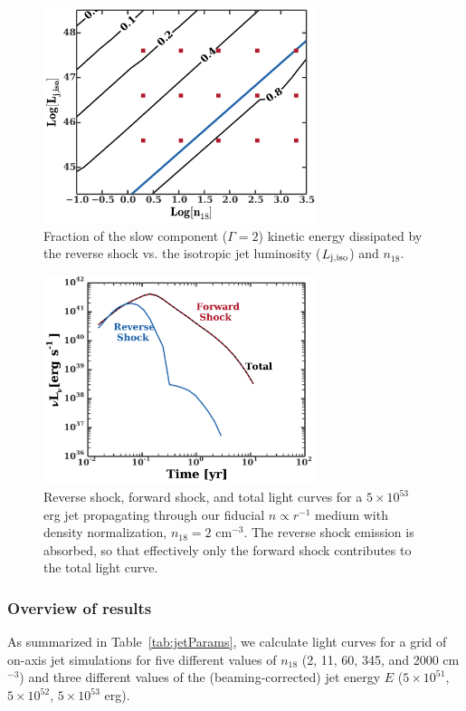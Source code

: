 \documentclass[usenatbib,fleqn]{mnras}
\begin{document}
\begin{figure}
\includegraphics[width=8cm]{diss.pdf}
\caption{\label{fig:diss} Fraction of the slow component
  ($\Gamma=2$) kinetic energy dissipated by the reverse shock
  vs. the isotropic jet luminosity ($L_{\rm j,iso}$) and $n_{18}$.}
\end{figure}

\begin{figure}
  \includegraphics[width=8cm]{reverse.pdf}
  \caption{\label{fig:reverse} Reverse shock, forward shock, and total
    light curves for a $5\times 10^{53}$ erg jet propagating through
    our fiducial $n\propto r^{-1}$ medium with density normalization,
    $n_{18}=2$ cm$^{-3}$. The reverse shock emission is absorbed, so
    that effectively only the forward shock contributes to the total
    light curve.}
\end{figure}


\subsubsection{Overview of results}
As summarized in Table~\ref{tab:jetParams}, we calculate light curves
for a grid of on-axis jet simulations for five different values of
$n_{18}$ (2, 11, 60, 345, and 2000 cm$^{-3}$) and three different
values of the (beaming-corrected) jet energy $E$ ($5\times 10^{51}$,
$5\times 10^{52}$, $5\times 10^{53}$ erg). 
\end{document}
